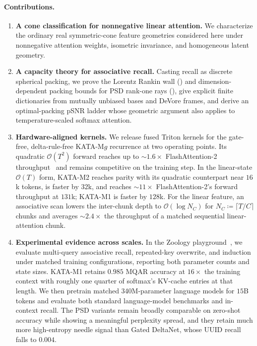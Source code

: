\documentclass{article}
\newcommand{\1}{\bm{1}}
\newcommand{\defeq}{\coloneqq}
\def\gO{{\mathcal{O}}}
\newcommand{\seql}{T}
\theoremstyle{definition}
\begin{document}
\paragraph{Contributions.}
\begin{enumerate}
  \item \textbf{A cone classification for nonnegative linear attention.} We characterize the
        ordinary real symmetric-cone feature geometries considered here under nonnegative attention
        weights, isometric invariance, and homogeneous latent geometry.
  \item \textbf{A capacity theory for associative recall.} Casting recall as discrete spherical
        packing, we prove the Lorentz Rankin wall () and dimension-dependent packing bounds for PSD rank-one rays
        (), give explicit finite dictionaries from mutually unbiased
        bases and DeVore frames, and derive an optimal-packing pSNR ladder whose geometric argument
        also applies to temperature-scaled softmax attention.
  \item \textbf{Hardware-aligned kernels.} We release fused Triton kernels for the gate-free,
        delta-rule-free KATA-M$g$ recurrence at two operating points. Its quadratic
        $\gO(\seql^2)$ forward reaches up to ${\sim}1.6\times$ FlashAttention-2
        throughput~\citep{dao23fa2} and remains competitive on the training step. In the
        linear-state $\gO(\seql)$ form, KATA-M2 reaches parity with its quadratic counterpart near
        $16$k tokens, is faster by $32$k, and reaches ${\sim}11\times$ FlashAttention-2's forward
        throughput at $131$k; KATA-M1 is faster by $128$k. For the linear feature, an associative scan
        lowers the inter-chunk depth to $\gO(\log N_C)$ for
        $N_C\defeq\lceil\seql/C\rceil$ chunks and averages ${\sim}2.4\times$ the throughput
        of a matched sequential linear-attention chunk.
  \item \textbf{Experimental evidence across scales.} In the Zoology
        playground~\citep{arora23zoology}, we evaluate multi-query associative recall, repeated-key
        overwrite, and induction under matched training configurations, reporting both parameter counts and state sizes. KATA-M1 retains
        $0.985$ MQAR accuracy at $16\times$ the training context with roughly one quarter of
        softmax's KV-cache entries at that length. We then pretrain matched 340M-parameter
        language models for $15$B tokens and evaluate both standard language-model benchmarks
        and in-context recall. The PSD variants remain broadly comparable on zero-shot accuracy
        while showing a meaningful perplexity spread, and they retain much more high-entropy
        needle signal than Gated DeltaNet, whose UUID recall falls to $0.004$.
\end{enumerate}
\end{document}
